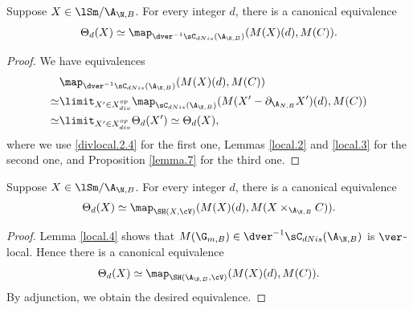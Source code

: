 \documentclass[10pt]{amsart}
\begin{document}
\begin{lem}
\label{local.4}
Suppose $X\in \lSm/{\A_{\N,B}}$.
For every integer $d$, there is a canonical equivalence
\[
\Theta_d(X)
\simeq 
\map_{\dver^{-1}\sC_{dNis}(\A_{\N,B})}
(M(X)(d),M(C)).
\]
\end{lem}
\begin{proof}
We have equivalences
\begin{align*}
& \map_{\dver^{-1}\sC_{dNis}(\A_{\N,B})}
(M(X)(d),M(C))
\\
\simeq &
\limit_{X'\in X_{div}^{op}} \map_{\sC_{dNis}(\A_{\N,B})}
(M(X'-\partial_{\A_{N,B}}X')(d),M(C))
\\
\simeq &
\limit_{X'\in X_{div}^{op}}
\Theta_d(X')
\simeq
\Theta_d(X),
\end{align*}
where we use \eqref{divlocal.2.4} for the first one, Lemmas \ref{local.2} and \ref{local.3} for the second one, and Proposition \ref{lemma.7} for the third one.
\end{proof}

\begin{thm}
\label{local.5}
Suppose $X\in \lSm/{\A_{\N,B}}$.
For every integer $d$, there is a canonical equivalence
\[
\Theta_d(X)
\simeq
\map_{\SH(X,\cV)}
(M(X)(d),M(X\times_{\A_{\N,B}}C)).
\]
\end{thm}
\begin{proof}
Lemma \ref{local.4} shows that $M(\G_{m,B})\in \dver^{-1}\sC_{dNis}(\A_{\N,B})$ is $\ver$-local.
Hence there is a canonical equivalence
\[
\Theta_d(X)
\simeq
\map_{\SH(\A_{\N,B},\cV)}
(M(X)(d),M(C)).
\]
By adjunction, we obtain the desired equivalence.
\end{proof}
\end{document}
